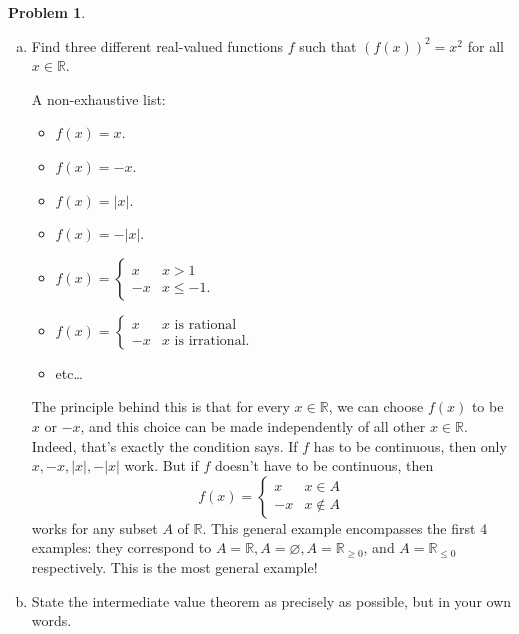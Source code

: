\documentclass[11pt,oneside]{amsart}
\theoremstyle{definition}
\newtheorem{problem}{Problem}
\newcommand{\bR}{\mathbb{R}}
\begin{document}
\begin{problem}
\begin{enumerate}[(a)]
            \item Find three different real-valued functions $f$ such that $(f(x))^2=x^2$ for all $x\in\bR$.
            \begin{solution}
                A non-exhaustive list:
                \begin{itemize}
                    \item $f(x)=x$.
                    \item $f(x)=-x$.
                    \item $f(x)=|x|$.
                    \item $f(x)=-|x|$.
                    \item $f(x)=\begin{cases} x&x>1\\ -x & x\leq -1.\end{cases}$
                    \item $f(x)=\begin{cases} x&\text{$x$ is rational}\\ -x & \text{$x$ is irrational}.\end{cases}$
                    \item etc\dots
                \end{itemize}
                The principle behind this is that for every $x\in\bR$, we can choose $f(x)$ to be $x$ or $-x$, and this choice can be made independently of all other $x\in\bR$. Indeed, that's exactly the condition says. If $f$ has to be continuous, then only $x,-x,|x|,-|x|$ work. But if $f$ doesn't have to be continuous, then
                \[f(x)=\begin{cases} x&x\in A\\ -x &x\notin A\end{cases}\]
                works for any subset $A$ of $\bR$. This general example encompasses the first 4 examples: they correspond to $A=\bR,A=\varnothing,A=\bR_{\geq 0}$, and $A=\bR_{\leq 0}$ respectively. This is the most general example!
            \end{solution}
            \item State the intermediate value theorem as precisely as possible, but in your own words.

\end{enumerate}
\end{problem}
\end{document}
